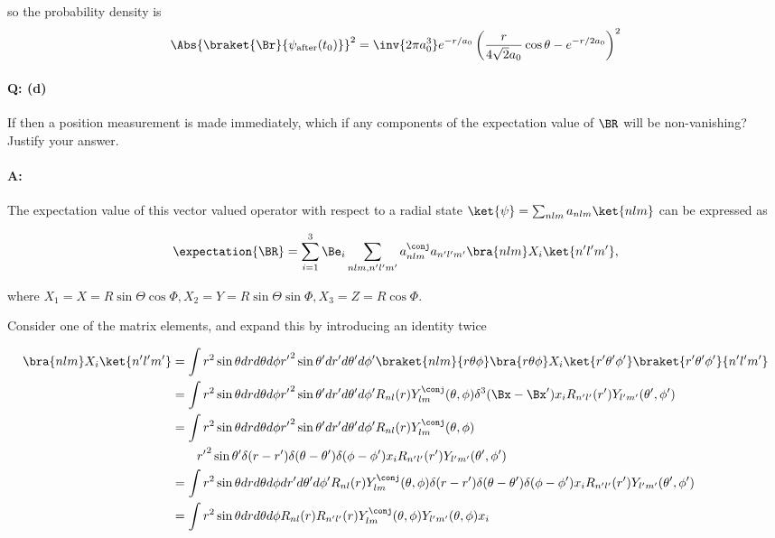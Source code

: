 {so the probability density is
\begin{equation}\label{eqn:qmIexamPractice2007Dec:4:300}
\Abs{\braket{\Br}{\psi_{\text{after}}(t_0)}}^2
= \inv{2 \pi a_0^3}
e^{-r/a_0}
\left(
\frac{r}{4\sqrt{2} a_0} \cos\theta
-e^{-r/2 a_0}
\right)^2
\end{equation}

\paragraph{Q: (d)}

If then a position measurement is made immediately, which if any components of the expectation value of \(\BR\) will be non-vanishing?  Justify your answer.

\paragraph{A:}

The expectation value of this vector valued operator with respect to a radial state \(\ket{\psi} = \sum_{nlm} a_{nlm} \ket{nlm}\) can be expressed as

\begin{equation}\label{eqn:qmIexamPractice2007Dec:4:400}
\expectation{\BR} = \sum_{i=1}^3 \Be_i \sum_{nlm, n'l'm'}
a_{nlm}^\conj a_{n'l'm'}
\bra{nlm} X_i
\ket{n'l'm'},
\end{equation}

where \(X_1 = X = R \sin\Theta \cos\Phi, X_2 = Y = R \sin\Theta \sin\Phi, X_3 = Z = R \cos\Phi\).

Consider one of the matrix elements, and expand this by introducing an identity twice

\begin{equation}\label{eqn:qmIexamPractice2007Dec:550}
\begin{aligned}
\bra{nlm} X_i \ket{n'l'm'}
&=
\int
r^2 \sin\theta dr d\theta d\phi
{r'}^2 \sin\theta' dr' d\theta' d\phi'
\braket{nlm}{r \theta \phi} \bra{r \theta \phi} X_i \ket{r' \theta' \phi' }\braket{r' \theta' \phi'}{n'l'm'} \\
&=
\int
r^2 \sin\theta dr d\theta d\phi
{r'}^2 \sin\theta' dr' d\theta' d\phi'
R_{nl}(r) Y_{lm}^\conj(\theta,\phi)
\delta^3(\Bx - \Bx') x_i
R_{n'l'}(r') Y_{l'm'}(\theta',\phi')
\\
&=
\int
r^2 \sin\theta dr d\theta d\phi
{r'}^2 \sin\theta' dr' d\theta' d\phi'
R_{nl}(r) Y_{lm}^\conj(\theta,\phi) \\
&\qquad{r'}^2 \sin\theta' \delta(r-r') \delta(\theta - \theta') \delta(\phi-\phi')
x_i
R_{n'l'}(r') Y_{l'm'}(\theta',\phi')
\\
&=
\int
r^2 \sin\theta dr d\theta d\phi
dr' d\theta' d\phi'
R_{nl}(r) Y_{lm}^\conj(\theta,\phi)
\delta(r-r') \delta(\theta - \theta') \delta(\phi-\phi')
x_i
R_{n'l'}(r') Y_{l'm'}(\theta',\phi')
\\
&=
\int
r^2 \sin\theta dr d\theta d\phi
R_{nl}(r) R_{n'l'}(r)
Y_{lm}^\conj(\theta,\phi) Y_{l'm'}(\theta,\phi)
x_i
\\
\end{aligned}
\end{equation}

}
